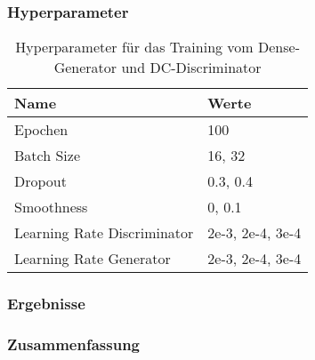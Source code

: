 \subsubsection{Hyperparameter}
\begin{table}[H]
	\centering
	\begin{tabular}{l l}
		Name                        & Werte            \\ \hline
		Epochen                     & 100              \\
		Batch Size                  & 16, 32           \\
		Dropout                     & 0.3, 0.4         \\
		Smoothness                  & 0, 0.1           \\
		Learning Rate Discriminator & 2e-3, 2e-4, 3e-4 \\
		Learning Rate Generator     & 2e-3, 2e-4, 3e-4
	\end{tabular}
	\caption{Hyperparameter für das Training vom Dense-Generator und DC-Discriminator}
\end{table}
\subsubsection{Ergebnisse}
\subsubsection{Zusammenfassung}
